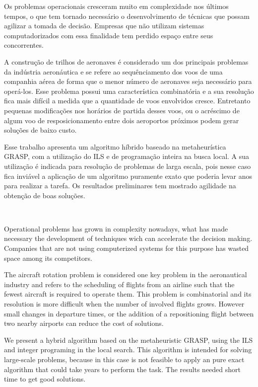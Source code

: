 \documentclass[oneside,normaltoc,espacoumemeio,PGTEXdissertacao]{pgeeltex}
\begin{document}
\begin{resumoPGTEX}
Os problemas operacionais cresceram muito em complexidade nos
últimos tempos, o que tem tornado necessário o desenvolvimento de técnicas que possam agilizar a tomada de decisão. Empresas que não utilizam sistemas 
computadorizados com essa finalidade tem perdido espaço entre seus concorrentes.
 
 A construção de trilhos de aeronaves é considerado um dos principais problemas da indústria aeronáutica e se 
 refere ao sequênciamento dos voos de uma companhia aérea de forma que o menor número de aeronaves seja necessário 
 para operá-los. Esse problema possui uma característica combinatória e a sua
 resolução fica mais difícil a medida que a quantidade de voos envolvidos cresce. Entretanto pequenas modificações nos horários de partida desses voos, 
 ou o acréscimo de algum voo de resposicionamento entre dois aeroportos próximos podem gerar soluções de baixo custo.
 
 Esse trabalho apresenta um algoritmo híbrido baseado na metaheurística GRASP,
 com a utilização do ILS e de programação inteira na busca local. A sua
 utilização é indicada para resolução de problemas de larga
 escala, pois nesse caso fica inviável a aplicação de um algoritmo puramente exato que poderia levar anos para realizar a tarefa. Os resultados preliminares tem mostrado agilidade na obtenção de boas soluções.
 
 \\
 
 \end{resumoPGTEX}

\begin{abstractPGTEX}
Operational problems has grown in complexity nowadays, what has made
necessary the development of techniques wich can accelerate the decision
making. Companies that are not using computerized systems for this purpose has
wasted space among its competitors.

The aircraft rotation problem is considered one key problem in the
aeronautical industry and refers to the scheduling of flights from an
airline such that the fewest aircraft is required to operate them. This problem
is combinatorial and its resolution is more difficult when the number of
involved flights grows. However small changes in departure times, or the
addition of a repositioning flight between two nearby airports can
reduce the cost of solutions.

We present a hybrid algorithm based on the metaheuristic GRASP, using the ILS
and integer programing in the local search. This algorithm is intended for
solving large-scale problems, because in this case is not feasible to apply an pure
exact algorithm that could take years to perform the task. 
The results needed short time to get good solutions.

\end{abstractPGTEX}
\end{document}
